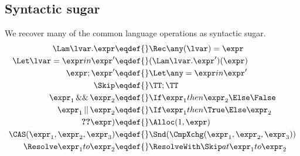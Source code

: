 \subsection{Syntactic sugar}

We recover many of the common language operations as syntactic sugar.
\begin{align*}
  \Lam \lvar. \expr \eqdef{}& \Rec\any(\lvar)= \expr \\
  \Let \lvar = \expr in \expr' \eqdef{}& (\Lam \lvar. \expr')(\expr) \\
  \expr; \expr' \eqdef{}& \Let \any = \expr in \expr' \\
  \Skip \eqdef{}& \TT; \TT \\
  \expr_1 \mathop{\&\&} \expr_2 \eqdef{}& \If \expr_1 then \expr_2 \Else \False \\
  \expr_1 \mathop{||} \expr_2 \eqdef{}& \If \expr_1 then \True \Else \expr_2 \\
  \Ref(\expr) \eqdef{}& \Alloc(1,\expr) \\
  \CAS(\expr_1, \expr_2, \expr_3) \eqdef{}& \Snd(\CmpXchg(\expr_1, \expr_2, \expr_3)) \\
  \Resolve \expr_1 to \expr_2 \eqdef{}& \ResolveWith \Skip at \expr_1 to \expr_2
\end{align*}

